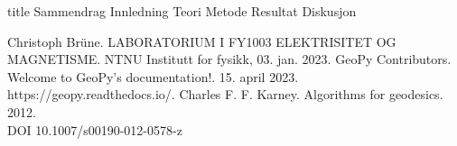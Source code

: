 \documentclass[5p]{article}
\begin{document}
{title} %
{Sammendrag}
\pagebreak
{Innledning}
{Teori}
{Metode}
{Resultat}
{Diskusjon}

\begin{thebibliography}{5}
Christoph Brüne. LABORATORIUM I FY1003 ELEKTRISITET OG MAGNETISME. NTNU Institutt for fysikk, 03. jan. 2023.
 GeoPy Contributors. Welcome to GeoPy’s documentation!. 15. april 2023. 
\\ https://geopy.readthedocs.io/.
 Charles F. F. Karney. Algorithms for geodesics. 2012.
\\ DOI 10.1007/s00190-012-0578-z
\end{thebibliography}
\end{document}

